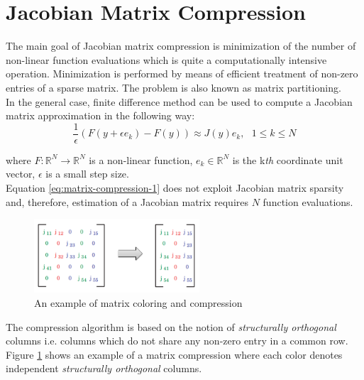 \section{Jacobian Matrix Compression}
\label{sec:jacobian-matrix-compression}


The main goal of Jacobian matrix compression is minimization of the number of non-linear function evaluations which is quite a computationally intensive operation. Minimization is performed by means of efficient treatment of non-zero entries of a sparse matrix. The problem is also known as matrix partitioning.\\


In the general case, finite difference method can be used to compute a Jacobian matrix approximation in the following way:\\

\begin{equation} \label{eq:matrix-compression-1}
	\frac{1}{\epsilon} (F(y + \epsilon e_{k}) - F(y)) \approx J(y) e_{k}, \: \: \: 1 \leq k \leq N
\end{equation}

where $F : \mathbb{R}^{N} \rightarrow \mathbb{R}^{N}$  is a non-linear function, $e_{k} \in \mathbb{R}^{N}$ is the k\textit{th} coordinate unit vector, $\epsilon$ is a small step size.\\


Equation \ref{eq:matrix-compression-1} does not exploit Jacobian matrix sparsity and, therefore, estimation of a Jacobian matrix requires $N$ function evaluations.\\


\figpointer{\ref{fig:example-of-matrix-compression}}
\begin{figure}[htpb]
  \centering
  \includegraphics[width=0.55\textwidth]{figures/chapter-3/matrix-compression-example.png}
\caption{An example of matrix coloring and compression \cite{gebremedhin2005color}}
\label{fig:example-of-matrix-compression}
\end{figure}


The compression algorithm is based on the notion of \textit{structurally orthogonal} columns i.e. columns which do not share any non-zero entry in a common row. Figure \ref{fig:example-of-matrix-compression} shows an example of a matrix compression where each color denotes independent \textit{structurally orthogonal} columns.\\


